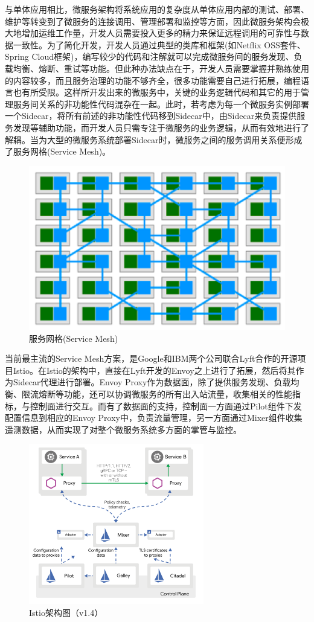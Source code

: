 \documentclass[12pt,a4paper]{article}
\theoremstyle{definition}
\begin{document}
与单体应用相比，微服务架构将系统应用的复杂度从单体应用内部的测试、部署、维护等转变到了微服务的连接调用、管理部署和监控等方面，因此微服务架构会极大地增加运维工作量，开发人员需要投入更多的精力来保证远程调用的可靠性与数据一致性。为了简化开发，开发人员通过典型的类库和框架(如Netflix OSS套件、Spring Cloud框架)，编写较少的代码和注解就可以完成微服务间的服务发现、负载均衡、熔断、重试等功能。但此种办法缺点在于，开发人员需要掌握并熟练使用的内容较多，而且服务治理的功能不够齐全，很多功能需要自己进行拓展，编程语言也有所受限。这样所开发出来的微服务中，关键的业务逻辑代码和其它的用于管理服务间关系的非功能性代码混杂在一起。此时，若考虑为每一个微服务实例部署一个Sidecar，将所有前述的非功能性代码移到Sidecar中，由Sidecar来负责提供服务发现等辅助功能，而开发人员只需专注于微服务的业务逻辑，从而有效地进行了解耦。当为大型的微服务系统部署Sidecar时，微服务之间的服务调用关系便形成了服务网格(Service Mesh)。
\begin{figure}[ht]
 \centering
 \includegraphics[]{images/service_mesh.png}
 \caption{服务网格(Service Mesh)}
 \label{fig:service_mesh}
\end{figure}

当前最主流的Service Mesh方案，是Google和IBM两个公司联合Lyft合作的开源项目Istio。在Istio的架构中，直接在Lyft开发的Envoy之上进行了拓展，然后将其作为Sidecar代理进行部署。Envoy Proxy作为数据面，除了提供服务发现、负载均衡、限流熔断等功能，还可以协调微服务的所有出入站流量，收集相关的性能指标，与控制面进行交互。而有了数据面的支持，控制面一方面通过Pilot组件下发配置信息到相应的Envoy Proxy中，负责流量管理，另一方面通过Mixer组件收集遥测数据，从而实现了对整个微服务系统多方面的掌管与监控。
\begin{figure}[ht]
 \centering
 \includegraphics[height=7cm]{images/istio_arch.png}
 \caption{Istio架构图（v1.4）}
 \label{fig:istio_arch}
\end{figure}
\end{document}
